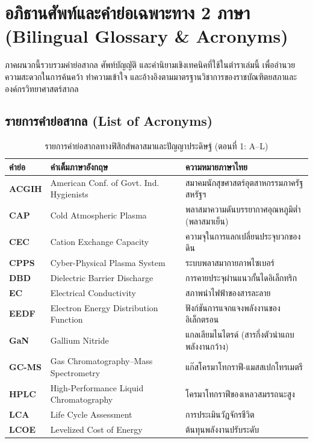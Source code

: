 
\chapter{อภิธานศัพท์และคำย่อเฉพาะทาง 2 ภาษา (Bilingual Glossary \& Acronyms)}
\label{app:glossary_and_acronyms}

ภาคผนวกนี้รวบรวมคำย่อสากล ศัพท์บัญญัติ และคำนิยามเชิงเทคนิคที่ใช้ในตำราเล่มนี้ เพื่ออำนวยความสะดวกในการค้นคว้า ทำความเข้าใจ และอ้างอิงตามมาตรฐานวิชาการของราชบัณฑิตยสภาและองค์กรวิทยาศาสตร์สากล

\section{รายการคำย่อสากล (List of Acronyms)}
\label{app:sec_acronyms}

\begin{table}[H]
\centering
\caption{รายการคำย่อสากลทางฟิสิกส์พลาสมาและปัญญาประดิษฐ์ (ตอนที่ 1: A--L)}
\label{tab:app_acronyms_part1}
\begin{tabularx}{\textwidth}{l l X}
\toprule
\textbf{คำย่อ} & \textbf{คำเต็มภาษาอังกฤษ} & \textbf{ความหมายภาษาไทย} \\
\midrule
\textbf{ACGIH} & American Conf. of Govt. Ind. Hygienists & สมาคมนักสุขศาสตร์อุตสาหกรรมภาครัฐสหรัฐฯ \\
\textbf{CAP} & Cold Atmospheric Plasma & พลาสมาความดันบรรยากาศอุณหภูมิต่ำ (พลาสมาเย็น) \\
\textbf{CEC} & Cation Exchange Capacity & ความจุในการแลกเปลี่ยนประจุบวกของดิน \\
\textbf{CPPS} & Cyber-Physical Plasma System & ระบบพลาสมากายภาพไซเบอร์ \\
\textbf{DBD} & Dielectric Barrier Discharge & การคายประจุผ่านแนวกั้นไดอิเล็กทริก \\
\textbf{EC} & Electrical Conductivity & สภาพนำไฟฟ้าของสารละลาย \\
\textbf{EEDF} & Electron Energy Distribution Function & ฟังก์ชันการแจกแจงพลังงานของอิเล็กตรอน \\
\textbf{GaN} & Gallium Nitride & แกลเลียมไนไตรด์ (สารกึ่งตัวนำแถบพลังงานกว้าง) \\
\textbf{GC-MS} & Gas Chromatography--Mass Spectrometry & แก๊สโครมาโทกราฟี-แมสสเปกโทรเมตรี \\
\textbf{HPLC} & High-Performance Liquid Chromatography & โครมาโทกราฟีของเหลวสมรรถนะสูง \\
\textbf{LCA} & Life Cycle Assessment & การประเมินวัฏจักรชีวิต \\
\textbf{LCOE} & Levelized Cost of Energy & ต้นทุนพลังงานปรับระดับ \\
\bottomrule
\end{tabularx}
\end{table}


